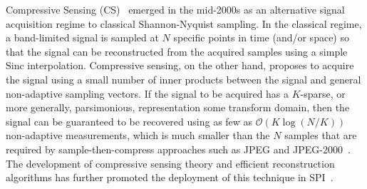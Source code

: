 Compressive Sensing (CS)~\citep{donoho2006compressed, candes2006compressive, baraniuk2014introduction, baraniuk2008simple} emerged in the mid-2000s as an alternative signal acquisition regime to classical Shannon-Nyquist sampling. In the classical regime, a band-limited signal is sampled at $N$ specific points in time (and/or space) so that the signal can be reconstructed from the acquired samples using a simple Sinc interpolation. Compressive sensing, on the other hand, proposes to acquire the signal using a small number of inner products between the signal and general non-adaptive sampling vectors. If the signal to be acquired has a $K$-sparse, or more generally, parsimonious, representation some transform domain, then the signal can be guaranteed to be recovered using as few as $\mathcal{O}(K\log(N/K))$ non-adaptive measurements, which is much smaller than the $N$ samples that are required by sample-then-compress approaches such as JPEG and JPEG-2000~\citep{skodras2001jpeg}. The development of compressive sensing theory and efficient reconstruction algorithms has further promoted the deployment of this technique in SPI~\citep{duarte2008single}.


